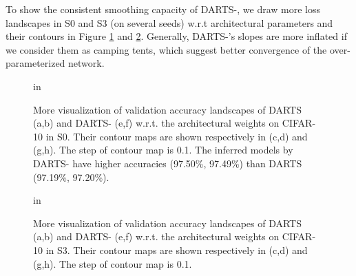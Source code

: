 \documentclass{article} \usepackage{iclr2021_conference,times}
\begin{document}
To show the consistent smoothing capacity of DARTS-, we draw more loss landscapes in S0 and S3 (on several seeds) w.r.t architectural parameters and their contours in Figure \ref{fig:landcape-loss-val-more-s0} and \ref{fig:landcape-loss-val-more-s3}.  Generally, DARTS-'s slopes are more inflated if we consider them as camping tents, which suggest better convergence of the over-parameterized network. 

\begin{figure}[ht]
	\centering
	 in
	\caption{More visualization of validation accuracy landscapes of  DARTS (a,b) and DARTS- (e,f) w.r.t. the architectural weights  on CIFAR-10 in S0. Their contour maps are shown respectively in (c,d) and (g,h). The step of contour map is 0.1. The inferred models by DARTS- have higher accuracies (97.50\%, 97.49\%) than DARTS (97.19\%, 97.20\%).}
	\label{fig:landcape-loss-val-more-s0}
\end{figure}

\begin{figure}[ht]
	\centering
	 in
	\caption{More visualization of validation accuracy landscapes of  DARTS (a,b) and DARTS- (e,f) w.r.t. the architectural weights  on CIFAR-10 in S3. Their contour maps are shown respectively in (c,d) and (g,h). The step of contour map is 0.1.}
	\label{fig:landcape-loss-val-more-s3}
\end{figure}
\end{document}
